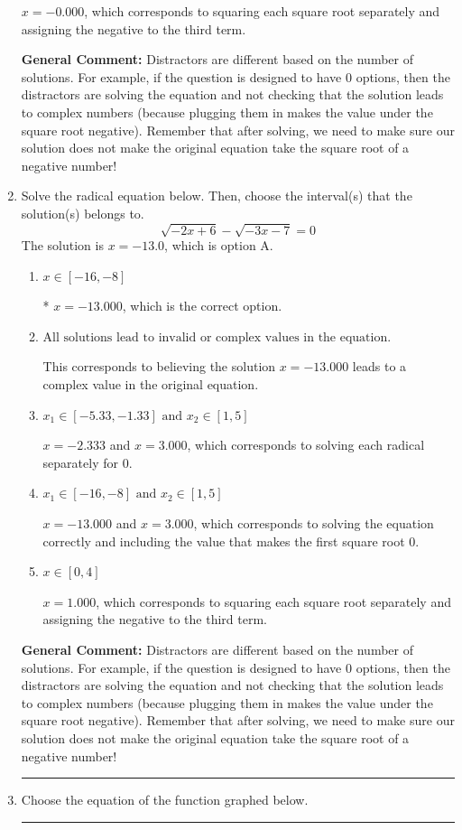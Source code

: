 \documentclass{extbook}[14pt]
\newcommand{\litem}[1]{\item #1

\rule{\textwidth}{0.4pt}}
\begin{document}
\begin{enumerate}
{\begin{enumerate}[label=\Alph*.]
$x = -0.000$, which corresponds to squaring each square root separately and assigning the negative to the third term.
\end{enumerate}

\textbf{General Comment:} Distractors are different based on the number of solutions. For example, if the question is designed to have 0 options, then the distractors are solving the equation and not checking that the solution leads to complex numbers (because plugging them in makes the value under the square root negative). Remember that after solving, we need to make sure our solution does not make the original equation take the square root of a negative number!
}
\litem{
Solve the radical equation below. Then, choose the interval(s) that the solution(s) belongs to.
\[ \sqrt{-2 x + 6} - \sqrt{-3 x - 7} = 0 \]The solution is \( x = -13.0 \), which is option A.\begin{enumerate}[label=\Alph*.]
\item \( x \in [-16,-8] \)

* $x = -13.000$, which is the correct option.
\item \( \text{All solutions lead to invalid or complex values in the equation.} \)

This corresponds to believing the solution $x = -13.000$ leads to a complex value in the original equation.
\item \( x_1 \in [-5.33, -1.33] \text{ and } x_2 \in [1,5] \)

$x = -2.333$ and $x = 3.000$, which corresponds to solving each radical separately for 0.
\item \( x_1 \in [-16, -8] \text{ and } x_2 \in [1,5] \)

$x = -13.000$ and $x = 3.000$, which corresponds to solving the equation correctly and including the value that makes the first square root 0.
\item \( x \in [0,4] \)

$x = 1.000$, which corresponds to squaring each square root separately and assigning the negative to the third term.
\end{enumerate}

\textbf{General Comment:} Distractors are different based on the number of solutions. For example, if the question is designed to have 0 options, then the distractors are solving the equation and not checking that the solution leads to complex numbers (because plugging them in makes the value under the square root negative). Remember that after solving, we need to make sure our solution does not make the original equation take the square root of a negative number!
}
\litem{
Choose the equation of the function graphed below.

}
\end{enumerate}
\end{document}
